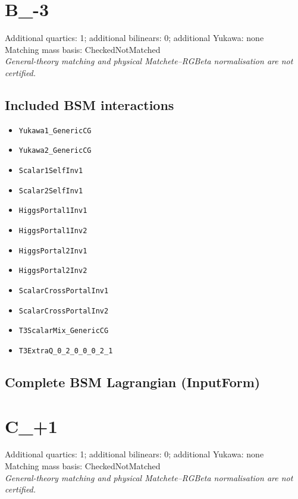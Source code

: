 \documentclass[10pt,a4paper]{article}
\begin{document}
\section{B\_-3}
Additional quartics: 1; additional bilinears: 0; additional Yukawa: none\\
Matching mass basis: CheckedNotMatched\\
\emph{General-theory matching and physical Matchete--RGBeta normalisation are not certified.}
\subsection*{Included BSM interactions}
\begin{itemize}
\item \texttt{Yukawa1\_GenericCG}
\item \texttt{Yukawa2\_GenericCG}
\item \texttt{Scalar1SelfInv1}
\item \texttt{Scalar2SelfInv1}
\item \texttt{HiggsPortal1Inv1}
\item \texttt{HiggsPortal1Inv2}
\item \texttt{HiggsPortal2Inv1}
\item \texttt{HiggsPortal2Inv2}
\item \texttt{ScalarCrossPortalInv1}
\item \texttt{ScalarCrossPortalInv2}
\item \texttt{T3ScalarMix\_GenericCG}
\item \texttt{T3ExtraQ\_0\_2\_0\_0\_0\_2\_1}
\end{itemize}
\subsection*{Complete BSM Lagrangian (InputForm)}

\clearpage
\section{C\_+1}
Additional quartics: 1; additional bilinears: 0; additional Yukawa: none\\
Matching mass basis: CheckedNotMatched\\
\emph{General-theory matching and physical Matchete--RGBeta normalisation are not certified.}
\end{document}
